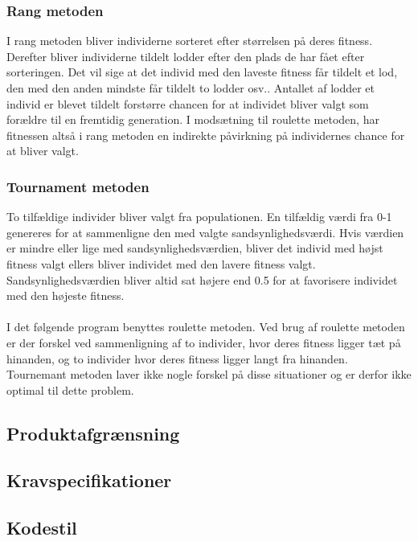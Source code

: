 \subsubsection{Rang metoden}
I rang metoden bliver individerne sorteret efter størrelsen på deres fitness. Derefter bliver individerne tildelt lodder efter den plads de har fået efter sorteringen. Det vil sige at det individ med den laveste fitness får tildelt et lod, den med den anden mindste får tildelt to lodder osv.. Antallet af lodder et individ er blevet tildelt forstørre chancen for at individet bliver valgt som forældre til en fremtidig generation. I modsætning til roulette metoden, har fitnessen altså i rang metoden en indirekte påvirkning på individernes chance for at bliver valgt.

\subsubsection{Tournament metoden}
To tilfældige individer bliver valgt fra populationen. En tilfældig værdi fra 0-1 genereres for at sammenligne den med valgte sandsynlighedsværdi. Hvis værdien er mindre eller lige med sandsynlighedsværdien, bliver det individ med højst fitness valgt ellers bliver individet med den lavere fitness valgt. Sandsynlighedsværdien bliver altid sat højere end 0.5 for at favorisere individet med den højeste fitness.
\\\\
I det følgende program benyttes roulette metoden. Ved brug af roulette metoden er der forskel ved sammenligning af to individer, hvor deres fitness ligger tæt på hinanden, og to individer hvor deres fitness ligger langt fra hinanden. Tournemant metoden laver ikke nogle forskel på disse situationer og er derfor ikke optimal til dette problem.

\subsection{Produktafgrænsning}
  

\subsection{Kravspecifikationer}
  

\subsection{Kodestil}
  